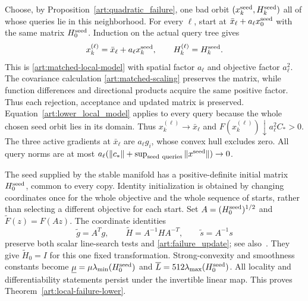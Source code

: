 Choose, by Proposition~\ref{art:quadratic_failure}, one bad orbit
$(x_k^{\rm seed},H_k^{\rm seed})$ all of whose queries lie in this neighborhood.
For every $\ell$, start at $\bar x_\ell+a_\ell x_0^{\rm seed}$ with the same matrix
$H_0^{\rm seed}$. Induction on the actual query tree gives
\[
 x_k^{(\ell)}=\bar x_\ell+a_\ell x_k^{\rm seed},\qquad H_k^{(\ell)}=H_k^{\rm seed}.
\]
This is \eqref{art:matched-local-model} with spatial factor $a_\ell$
and objective factor $a_\ell^2$. The covariance calculation
\eqref{art:matched-scaling} preserves the matrix, while function
differences and directional products acquire the same positive factor.
Thus each rejection, acceptance and updated matrix is preserved. Equation~\eqref{art:lower_local_model} applies to every
query because the whole chosen seed orbit lies in its domain.
Thus $x_k^{(\ell)}\to \bar x_\ell$ and
$F(x_k^{(\ell)})\downarrow a_\ell^2C_*>0$. The three active gradients at
$\bar x_\ell$ are $a_\ell g_i$, whose convex hull excludes zero.
All query norms are at most
$a_\ell(\|c_*\|+\sup_{\rm seed\ queries}\|x^{\rm seed}\|)\to0$.

The seed supplied by the stable manifold has a positive-definite initial
matrix $H_0^{\rm seed}$, common to every copy. Identity initialization is
obtained by changing coordinates once for the whole objective and the
whole sequence of starts, rather than selecting a different objective
for each start. Set $A=(H_0^{\rm seed})^{1/2}$ and $\widetilde F(z)=F(Az)$.
The coordinate identities
\[
 \widetilde g=A^Tg,\qquad \widetilde H=A^{-1}HA^{-T},\qquad
 \widetilde s=A^{-1}s
\]
preserve both scalar line-search tests and
\eqref{art:failure_update}; see also~\cite[Section~2]{LO}.
They give $\widetilde H_0=I$ for this one fixed transformation.
Strong-convexity and smoothness constants become
$\underline\mu=\mu\lambda_{\min}(H_0^{\rm seed})$ and
$\overline L=512\lambda_{\max}(H_0^{\rm seed})$.
All locality and differentiability statements persist under the
invertible linear map. This proves
Theorem~\ref{art:local-failure-lower}.
